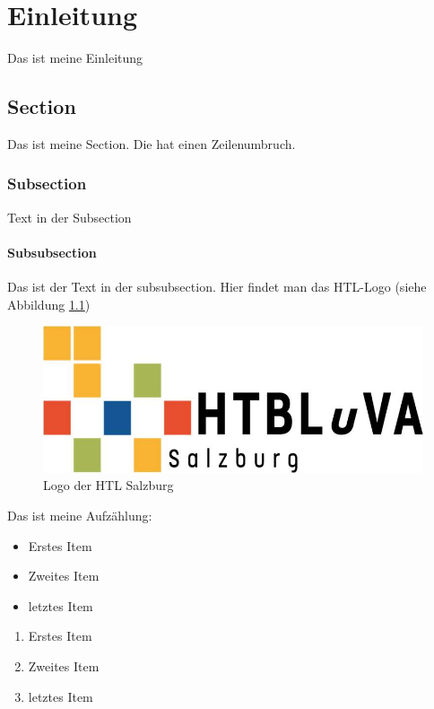\chapter{Einleitung}

Das ist meine Einleitung

\section{Section}
Das ist meine Section.
\newline	%
Die hat einen Zeilenumbruch.

\subsection{Subsection}
Text in der Subsection
\subsubsection{Subsubsection}
Das ist der Text in der subsubsection. Hier findet man das HTL-Logo (siehe Abbildung \ref{fig:HTL_Logo})

\begin{figure}[h]
	\centering
		\includegraphics[scale=0.5]{./Illustrations/HTL_Logo.jpg}
	\caption{Logo der HTL Salzburg}
	\label{fig:HTL_Logo}
\end{figure}

Das ist meine Aufzählung:
\begin{itemize}
	\item Erstes Item
	\item Zweites Item
	\item letztes Item
\end{itemize}

\begin{enumerate}
	\item Erstes Item
	\item Zweites Item
	\item letztes Item
\end{enumerate}

